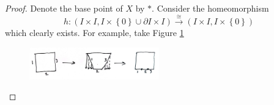 \documentclass[reqno]{amsart}
\theoremstyle{definition}
\theoremstyle{remark}
\begin{document}
\begin{proof}
    Denote the base point of $X$ by $*$.
    Consider the homeomorphism
    \[
    h \colon \left( I \times I,
    I \times \left\{ 0 \right\} \cup 
\partial I \times I \right) 
\stackrel{\cong}{\to} \left( I \times I, I \times 
\left\{ 0 \right\} \right) 
    \] 
    which clearly exists. For example, take Figure
    \ref{fig:IWIDK01-jpeg}
    \begin{figure}[htpb]
        \centering
        \includegraphics[width=0.5\textwidth]{IWIDK01.jpeg}
        \caption{}
        \label{fig:IWIDK01-jpeg}
    \end{figure}


\end{proof}
\end{document}
